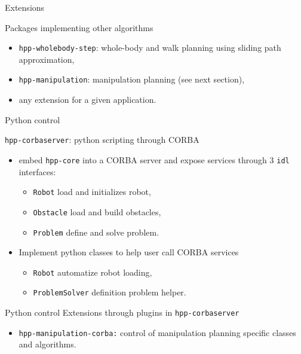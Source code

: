\begin {frame} {Extensions}

Packages implementing other algorithms
\begin{itemize}
  \item \texttt{hpp-wholebody-step}: whole-body and walk planning using sliding path approximation,
    \pause
  \item \texttt{hpp-manipulation}: manipulation planning (see next section),
    \pause
  \item any extension for a given application.
\end{itemize}
\end {frame}

%
%

\begin {frame} {Python control}

\texttt{hpp-corbaserver}: python scripting through CORBA
\begin{itemize}
\item embed \texttt{hpp-core} into a CORBA server and expose services through 3 \texttt{idl} interfaces:
  \begin{itemize}
  \item \texttt{Robot} load and initializes robot,
  \item \texttt{Obstacle} load and build obstacles,
  \item \texttt{Problem} define and solve problem.
  \end{itemize}
\pause
\item Implement python classes to help user call CORBA services
  \begin{itemize}
    \item \texttt {Robot} automatize robot loading,
    \item \texttt {ProblemSolver} definition problem helper.
  \end{itemize}
\end{itemize}
\end {frame}

%
%

\begin {frame} {Python control}
  Extensions through plugins in \texttt{hpp-corbaserver}
  \begin{itemize}
    \item \texttt {hpp-manipulation-corba:} control of manipulation planning specific classes and algorithms.
  \end{itemize}
\end {frame}

